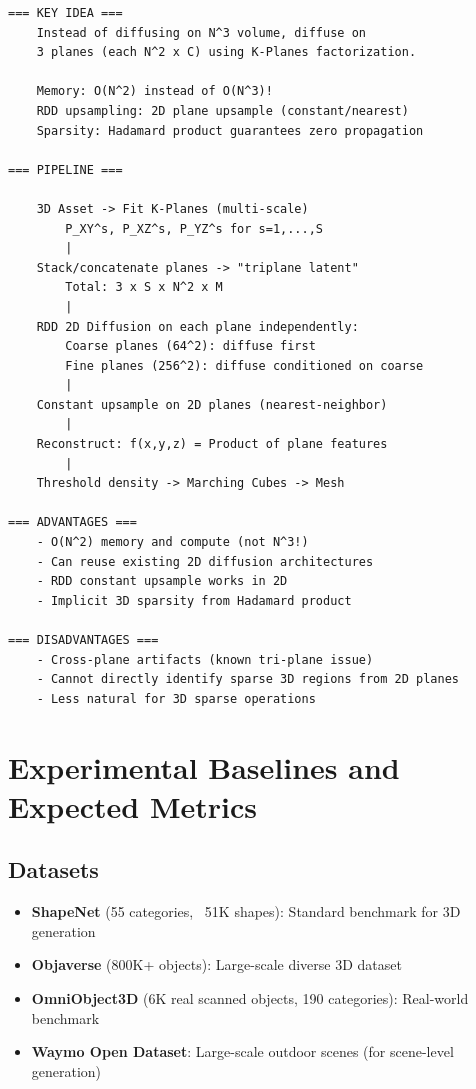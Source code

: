\documentclass[11pt, a4paper]{article}
\begin{document}
\begin{lstlisting}[style=flowchart, caption={RDD on Factored Plane Representation}]
=== KEY IDEA ===
    Instead of diffusing on N^3 volume, diffuse on 
    3 planes (each N^2 x C) using K-Planes factorization.
    
    Memory: O(N^2) instead of O(N^3)!
    RDD upsampling: 2D plane upsample (constant/nearest)
    Sparsity: Hadamard product guarantees zero propagation

=== PIPELINE ===

    3D Asset -> Fit K-Planes (multi-scale)
        P_XY^s, P_XZ^s, P_YZ^s for s=1,...,S
        |
    Stack/concatenate planes -> "triplane latent"
        Total: 3 x S x N^2 x M
        |
    RDD 2D Diffusion on each plane independently:
        Coarse planes (64^2): diffuse first
        Fine planes (256^2): diffuse conditioned on coarse
        |
    Constant upsample on 2D planes (nearest-neighbor)
        |
    Reconstruct: f(x,y,z) = Product of plane features
        |
    Threshold density -> Marching Cubes -> Mesh

=== ADVANTAGES ===
    - O(N^2) memory and compute (not N^3!)
    - Can reuse existing 2D diffusion architectures
    - RDD constant upsample works in 2D
    - Implicit 3D sparsity from Hadamard product
    
=== DISADVANTAGES ===
    - Cross-plane artifacts (known tri-plane issue)
    - Cannot directly identify sparse 3D regions from 2D planes
    - Less natural for 3D sparse operations
\end{lstlisting}

\section{Experimental Baselines and Expected Metrics}

\subsection{Datasets}

\begin{itemize}
    \item \textbf{ShapeNet} (55 categories, ~51K shapes): Standard benchmark for 3D generation
    \item \textbf{Objaverse} (800K+ objects): Large-scale diverse 3D dataset
    \item \textbf{OmniObject3D} (6K real scanned objects, 190 categories): Real-world benchmark
    \item \textbf{Waymo Open Dataset}: Large-scale outdoor scenes (for scene-level generation)
\end{itemize}
\end{document}

